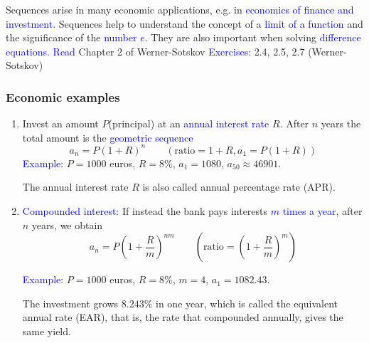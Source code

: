 \documentclass[11pt,aspectratio=169]{beamer}
\begin{document}
\begin{frame}{}
Sequences arise in many economic applications, e.g. in \textcolor{blue}{economics of finance and investment}.
\vskip 12pt
Sequences help to understand the concept of a \textcolor{blue}{limit of a function} and the significance of the \textcolor{blue}{number $e$}. 
\vskip 12pt
 They are also important when solving \textcolor{blue}{difference equations}.
\vskip 12pt
\textcolor{blue}{Read} Chapter 2 of Werner-Sotskov 
\vskip 12pt
 \textcolor{blue}{Exercises:} 2.4, 2.5, 2.7 (Werner-Sotskov)
\end{frame}



\begin{frame}
\frametitle{Economic examples  }
\begin{enumerate}
\item {Invest} an amount $P$(principal) at an \textcolor{blue}{annual interest rate} $R$. After $n$ years the total amount is the \textcolor{blue}{geometric sequence}
$$a_n=P(1+R)^n\qquad (\text{ratio}=1+R, a_1=P(1+R))$$
\textcolor{blue}{Example}: $P=1000$ euros, $R=8\%$, $a_1=1080$, $a_{50}\approx 46901$.

The annual interest rate $R$ is also called \alert{annual percentage rate} (APR).

%

\item \textcolor{blue}{Compounded interest:} If instead the bank pays interests \textcolor{blue}{$m$ times a year}, after $n$ years, we obtain
$$
a_n=P\left(1+\frac{R}{m}\right)^{n m}\qquad (\text{ratio}=(1+\frac{R}{m})^{m})
$$

\textcolor{blue}{Example}: $P=1000$ euros, $R=8\%$, $m=4$, $a_1=1082.43$. 

The investment grows $8.243 \%$ in one year, which is called the \alert{equivalent annual rate} (EAR), that is, the rate that compounded annually, gives the same yield.

\end{enumerate}
\end{frame}
\end{document}
